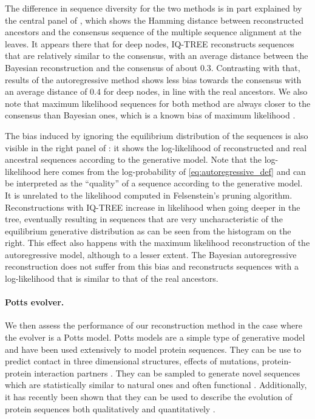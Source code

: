 The difference in sequence diversity for the two methods is in part explained by the central panel of , which shows the Hamming distance between reconstructed ancestors and the consensus sequence of the multiple sequence alignment at the leaves. 
It appears there that for deep nodes, IQ-TREE reconstructs sequences that are relatively similar to the consensus, with an average distance between the Bayesian reconstruction and the consensus of about $0.3$. 
Contrasting with that, results of the autoregressive method shows less bias towards the consensus with an average distance of $0.4$ for deep nodes, in line with the real ancestors. 
We also note that maximum likelihood sequences for both method are always closer to the consensus than Bayesian ones, which is a known bias of maximum likelihood \cite{williams_assessingaccuracyancestral_2006}. 

The bias induced by ignoring the equilibrium distribution of the sequences is also visible in the right panel of : it shows the log-likelihood of reconstructed and real ancestral sequences according to the generative model. 
Note that the log-likelihood here comes from the log-probability of \eqref{eq:autoregressive_def} and can be interpreted as the ``quality'' of a sequence according to the generative model. 
It is unrelated to the likelihood computed in Felsenstein's pruning algorithm. 
Reconstructions with IQ-TREE increase in likelihood when going deeper in the tree, eventually resulting in sequences that are very uncharacteristic of the equilibrium generative distribution as can be seen from the histogram on the right. 
This effect also happens with the maximum likelihood reconstruction of the autoregressive model, although to a lesser extent. 
The Bayesian autoregressive reconstruction does not suffer from this bias and reconstructs sequences with a log-likelihood that is similar to that of the real ancestors. \\

\paragraph*{Potts evolver.} We then assess the performance of our reconstruction method in the case where the evolver is a Potts model. 
Potts models are a simple type of generative model and have been used extensively to model protein sequences. 
They can be use to predict contact in three dimensional structures, effects of mutations, protein-protein interaction partners \cite{cocco_inversestatisticalphysics_2018}. 
They can be sampled to generate novel sequences which are statistically similar to natural ones and often functional \cite{russ_evolutionbasedmodeldesigning_2020,mcgee_generativecapacityprobabilistic_2021}.
Additionally, it has recently been shown that they can be used to describe the evolution of protein sequences both qualitatively and quantitatively \cite{bisardi_modelingsequencespaceexploration_2021}.

